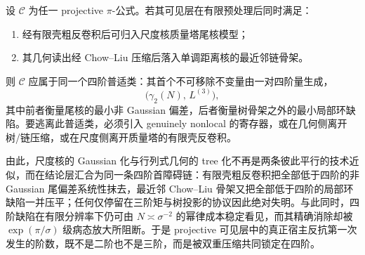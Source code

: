 \begin{conjecture}\label{conj:conclusion-projective-pi-fourth-order-universality}
设 \(\mathcal C\) 为任一 projective \(\pi\)-公式。若其可见层在有限预处理后同时满足：
\begin{enumerate}
  \item 经有限壳粗反卷积后可归入尺度核质量塔尾核模型；
  \item 其几何读出经 Chow--Liu 压缩后落入单调距离核的最近邻链骨架。
\end{enumerate}
则 \(\mathcal C\) 应属于同一个四阶普适类：其首个不可移除不变量由一对四阶量生成，
\[
\bigl(\gamma_2(N),\,L^{(3)}\bigr),
\]
其中前者衡量尾核的最小非 Gaussian 偏差，后者衡量树骨架之外的最小局部环缺陷。要逃离此普适类，必须引入 genuinely nonlocal 的寄存器，或在几何侧离开树/链压缩，或在尺度侧离开质量塔的有限壳反卷积。
\end{conjecture}

\noindent
由此，尺度核的 Gaussian 化与行列式几何的 tree 化不再是两条彼此平行的技术近似，而在结论层汇合为同一条四阶首障碍链：有限壳粗反卷积把全部低于四阶的非 Gaussian 尾偏差系统性抹去，最近邻 Chow--Liu 骨架又把全部低于四阶的局部环缺陷一并压平；任何仅停留在三阶矩与树投影的协议因此绝对失明。与此同时，四阶缺陷在有限分辨率下仍可由 \(N\asymp \sigma^{-2}\) 的幂律成本稳定看见，而其精确消除却被 \(\exp(\pi/\sigma)\) 级病态放大所阻断。于是 projective 可见层中的真正宿主反抗第一次发生的阶数，既不是二阶也不是三阶，而是被双重压缩共同锁定在四阶。
